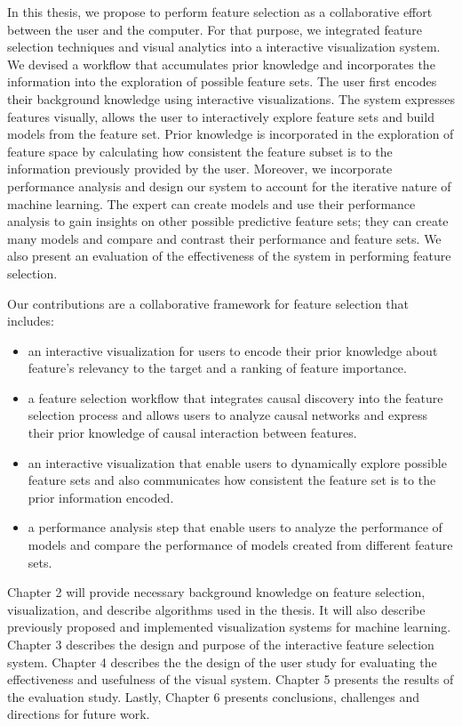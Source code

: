 In this thesis, we propose to perform feature selection as a collaborative effort between the user and the computer. For that purpose, we integrated feature selection techniques and visual analytics into a interactive visualization system. We devised a workflow that accumulates prior knowledge and incorporates the information into the exploration of possible feature sets. The user first encodes their background knowledge using interactive visualizations. The system expresses features visually, allows the user to interactively explore feature sets and build models from the feature set. Prior knowledge is incorporated in the exploration of feature space by calculating how consistent the feature subset is to the information previously provided by the user. Moreover, we incorporate performance analysis and design our system to account for the iterative nature of machine learning. The expert can create models and use their performance analysis to gain insights on other possible predictive feature sets; they can create many models and compare and contrast their performance and feature sets. We also present an evaluation of the effectiveness of the system in performing feature selection.

\indent Our contributions are a collaborative framework for feature selection that includes:
\begin{itemize}
  \item an interactive visualization for users to encode their prior knowledge about feature's relevancy to the target and a ranking of feature importance.
  \item a feature selection workflow that integrates causal discovery into the feature selection process and allows users to analyze causal networks and express their prior knowledge of causal interaction between features.
  \item an interactive visualization that enable users to dynamically explore possible feature sets and also communicates how consistent the feature set is to the prior information encoded.
  \item a performance analysis step that enable users to analyze the performance of models and compare the performance of models created from different feature sets.
\end{itemize}

Chapter 2 will provide necessary background knowledge on feature selection, visualization, and describe algorithms used in the thesis. It will also describe previously proposed and implemented visualization systems for machine learning. Chapter 3 describes the design and purpose of the interactive feature selection system. Chapter 4 describes the the design of the user study for evaluating the effectiveness and usefulness of the visual system. Chapter 5 presents the results of the evaluation study. Lastly, Chapter 6 presents conclusions, challenges and directions for future work.

